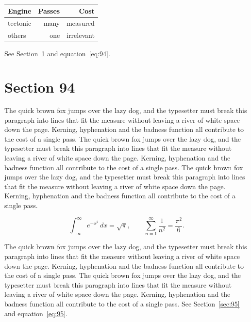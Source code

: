 \documentclass{article}
\begin{document}
\begin{center}
\begin{tabular}{lrr}
\toprule
Engine & Passes & Cost \\
\midrule
tectonic & many & measured \\
others & one & irrelevant \\
\bottomrule
\end{tabular}
\end{center}

See Section~\ref{sec:94} and equation~\eqref{eq:94}.
\section{Section 94}
\label{sec:94}
The quick brown fox jumps over the lazy dog, and the typesetter must break this paragraph into lines that fit the measure without leaving a river of white space down the page. Kerning, hyphenation and the badness function all contribute to the cost of a single pass. The quick brown fox jumps over the lazy dog, and the typesetter must break this paragraph into lines that fit the measure without leaving a river of white space down the page. Kerning, hyphenation and the badness function all contribute to the cost of a single pass. The quick brown fox jumps over the lazy dog, and the typesetter must break this paragraph into lines that fit the measure without leaving a river of white space down the page. Kerning, hyphenation and the badness function all contribute to the cost of a single pass. 

\begin{equation}\label{eq:94}
\int_{-\infty}^{\infty} e^{-x^{2}}\,dx = \sqrt{\pi}, \qquad
\sum_{n=1}^{\infty} \frac{1}{n^{2}} = \frac{\pi^{2}}{6}.
\end{equation}

The quick brown fox jumps over the lazy dog, and the typesetter must break this paragraph into lines that fit the measure without leaving a river of white space down the page. Kerning, hyphenation and the badness function all contribute to the cost of a single pass. The quick brown fox jumps over the lazy dog, and the typesetter must break this paragraph into lines that fit the measure without leaving a river of white space down the page. Kerning, hyphenation and the badness function all contribute to the cost of a single pass. 
See Section~\ref{sec:95} and equation~\eqref{eq:95}.
\end{document}
